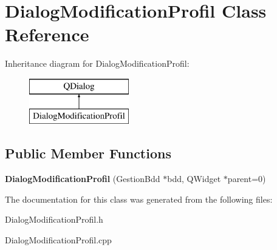 \section{Dialog\-Modification\-Profil Class Reference}
\label{class_dialog_modification_profil}
Inheritance diagram for Dialog\-Modification\-Profil\-:\begin{figure}[H]
\begin{center}
\leavevmode
\includegraphics[height=2.000000cm]{class_dialog_modification_profil}
\end{center}
\end{figure}
\subsection*{Public Member Functions}
\begin{DoxyCompactItemize}
\item 
{\bfseries Dialog\-Modification\-Profil} (Gestion\-Bdd $\ast$bdd, Q\-Widget $\ast$parent=0)\label{class_dialog_modification_profil_a700fb3134550ddfa98df89dfca285bb1}

\end{DoxyCompactItemize}


The documentation for this class was generated from the following files\-:\begin{DoxyCompactItemize}
\item 
Dialog\-Modification\-Profil.\-h\item 
Dialog\-Modification\-Profil.\-cpp\end{DoxyCompactItemize}
